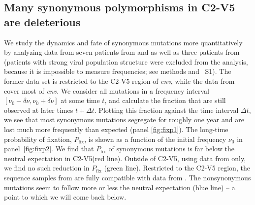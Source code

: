 \documentclass[rmp, twocolumn]{revtex4}
\newcommand{\pfix}{P_{\mathrm{fix}}}
\newcommand{\env}{\textit{env}}
\newcommand{\shankaregion}{C2-V5}
\newcommand{\PCApat}{1}
\begin{document}
\subsection{Many synonymous polymorphisms in \shankaregion{} are deleterious}
We study the dynamics and fate of synonymous mutations more quantitatively by
analyzing data from seven patients from
\citet{shankarappa_consistent_1999} and \citep{liu_selection_2006} as well as three patients from
\citet{bunnik_autologous_2008} (patients with strong viral population structure
were excluded from the analysis, because it is impossible to measure
frequencies; see methods and \figurename~S\PCApat). The
former data set is restricted to the \shankaregion{} region of \env, while
the data from \citet{bunnik_autologous_2008} cover most of \env.
We consider all mutations in a frequency interval $[\nu_0-\delta\nu, \nu_0+\delta\nu]$ at some time
$t$, and calculate the fraction that are still observed at later times $t+\Delta t$. Plotting this fraction against the time interval $\Delta t$, we see that
most synonymous mutations segregate for roughly one year and are lost much more
frequently than expected (panel \ref{fig:fixp1}). The long-time probability of
fixation, $\pfix$, is shown as a function of the
initial frequency $\nu_0$ in panel~\ref{fig:fixp2}. 
We find that $\pfix$ of synonymous mutations is far below
the neutral expectation in  \shankaregion (red line).  Outside of \shankaregion, using data from
\citet{bunnik_autologous_2008} only, we find no such reduction in $\pfix$ (green
line).
Restricted to the \shankaregion{} region, the sequence samples from
\citet{bunnik_autologous_2008} are fully compatible with data from
\citet{shankarappa_consistent_1999}. The nonsynonymous mutations seem to follow
more or less the neutral expectation (blue line) -- a point to which we will
come back below.
\end{document}
